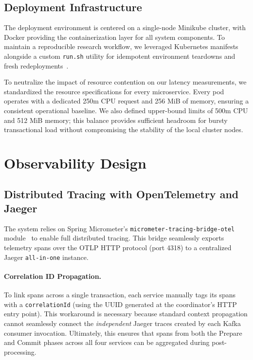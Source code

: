 \subsection{Deployment Infrastructure}
\label{subsec:deployment}

The deployment environment is centered on a single-node Minikube cluster, with Docker providing the containerization layer for all system components. To maintain a reproducible research workflow, we leveraged Kubernetes manifests alongside a custom \texttt{run.sh} utility for idempotent environment teardowns and fresh redeployments~\cite{burns2022kubernetes}. 

To neutralize the impact of resource contention on our latency measurements, we standardized the resource specifications for every microservice. Every pod operates with a dedicated 250m CPU request and 256 MiB of memory, ensuring a consistent operational baseline. We also defined upper-bound limits of 500m CPU and 512 MiB memory; this balance provides sufficient headroom for bursty transactional load without compromising the stability of the local cluster nodes.

\section{Observability Design}
\label{sec:observability}

\subsection{Distributed Tracing with OpenTelemetry and Jaeger}
\label{subsec:tracing-design}

The system relies on Spring Micrometer's \texttt{micrometer-tracing-bridge-otel}
module~\cite{micrometer2024} to enable full distributed tracing.
%
This bridge seamlessly exports telemetry spans over the OTLP HTTP protocol
(port 4318) to a centralized Jaeger \texttt{all-in-one} instance.

\paragraph{Correlation ID Propagation.}
To link spans across a single transaction, each service manually tags its
spans with a \texttt{correlationId} (using the UUID generated at the
coordinator's HTTP entry point).
%
This workaround is necessary because standard context propagation cannot seamlessly
connect the \emph{independent} Jaeger traces created by each Kafka consumer invocation.
%
Ultimately, this ensures that spans from both the Prepare and Commit phases
across all four services can be aggregated during post-processing.


